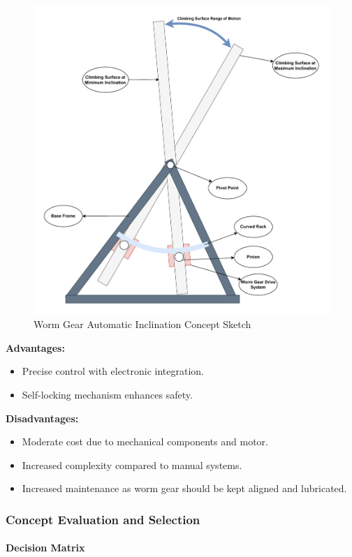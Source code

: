 \begin{figure}[H]
    \centering
    \includegraphics[width=0.6\linewidth]{figs/concept_design/WormGear_Concept.pdf}
    \caption{Worm Gear Automatic Inclination Concept Sketch}
    \label{fig:wormgear-concept}
\end{figure}

\textbf{Advantages:}
\begin{itemize}
    \item Precise control with electronic integration.
    \item Self-locking mechanism enhances safety.
\end{itemize}

\textbf{Disadvantages:}
\begin{itemize}
    \item Moderate cost due to mechanical components and motor.
    \item Increased complexity compared to manual systems.
    \item Increased maintenance as worm gear should be kept aligned and lubricated.
\end{itemize}

\subsubsection{Concept Evaluation and Selection}

\paragraph{Decision Matrix}

